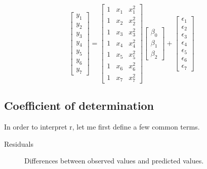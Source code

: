 \begin{equation}\label{eq:polynomialRegression}
  \begin{bmatrix}y_1 \\ y_2 \\ y_3 \\ y_4 \\ y_5 \\ y_6 \\ y_7 \end{bmatrix}
  =
  \begin{bmatrix}1 & x_1 & x_1^2 \\1 & x_2  & x_2^2 \\1 & x_3  & x_3^2 \\1 & x_4  & x_4^2 \\1 & x_5  & x_5^2 \\1 & x_6  & x_6^2 \\ 1 & x_7  & x_7^2 \end{bmatrix}
  \begin{bmatrix} \beta_0 \\ \beta_1  \\ \beta_2 \end{bmatrix}
  +
  \begin{bmatrix} \epsilon_1 \\ \epsilon_2 \\ \epsilon_3 \\ \epsilon_4 \\ \epsilon_5 \\ \epsilon_6 \\ \epsilon_7 \end{bmatrix}
\end{equation}

\subsection{Coefficient of determination}\label{sec:coeffDetermination}

In order to interpret r, let me first define a few common terms.

\begin{description}
  \item[Residuals] Differences between observed values and predicted values.
\end{description}

